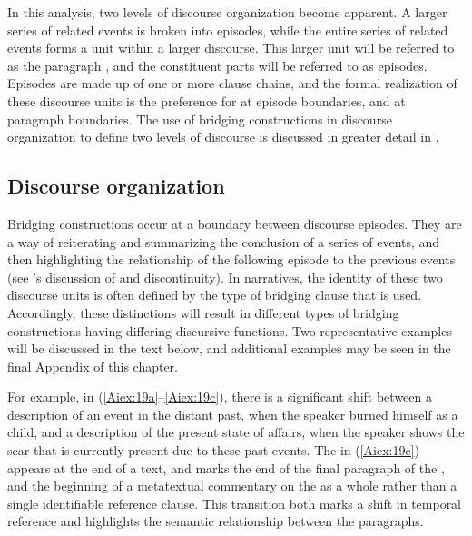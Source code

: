 \documentclass[output=paper]{LSP/langsci}
\begin{document}
In this analysis, two levels of discourse organization become apparent. A larger series of related events is broken into episodes, while the entire series of related events forms a  unit within a larger discourse. This larger unit will be referred to as the paragraph \citep[corresponding to the idea of a paragraph in][372]{Thompson.et.al.2007}, and the constituent parts will be referred to as episodes. Episodes are made up of one or more clause chains, and the formal realization of these discourse units is the preference for  at episode boundaries, and  at paragraph boundaries. The use of bridging constructions in discourse organization to define two levels of discourse is discussed in greater detail in \citet{Aiton.2015}.

\subsection{Discourse organization} 
\label{Aidiscourse.org}
Bridging constructions occur at a boundary between discourse episodes. They are a way of reiterating and summarizing the conclusion of a series of events, and then highlighting the relationship of the following episode to the previous events (see \citealt{devries.2005}’s discussion of  and discontinuity). In  narratives, the identity of these two discourse units is often defined by the type of bridging clause that is used. Accordingly, these distinctions will result in different types of bridging constructions having differing discursive functions. Two representative examples will be discussed in the text below, and additional examples may be seen in the final Appendix of this chapter.

	For example, in (\ref{Aiex:19a}--\ref{Aiex:19c}), there is a significant shift between a description of an event in the distant past, when the speaker burned himself as a child, and a description of the present state of affairs, when the speaker shows the scar that is currently present due to these past events. The  in (\ref{Aiex:19c}) appears at the end of a text, and marks the end of the final paragraph of the , and the beginning of a metatextual commentary on the  as a whole rather than a single identifiable reference clause. This transition both marks a shift in temporal reference and highlights the semantic relationship between the paragraphs.
	
\end{document}
